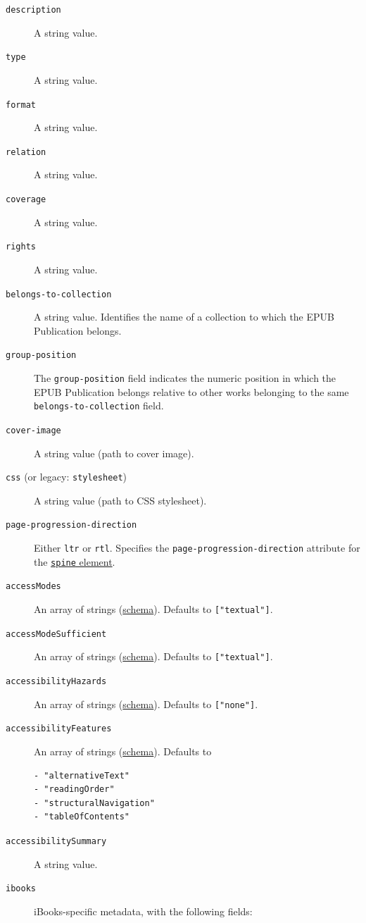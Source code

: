 \documentclass[
]{article}
\begin{document}
\begin{description}
\item[\texttt{description}]
A string value.
\item[\texttt{type}]
A string value.
\item[\texttt{format}]
A string value.
\item[\texttt{relation}]
A string value.
\item[\texttt{coverage}]
A string value.
\item[\texttt{rights}]
A string value.
\item[\texttt{belongs-to-collection}]
A string value. Identifies the name of a collection to which the EPUB
Publication belongs.
\item[\texttt{group-position}]
The \texttt{group-position} field indicates the numeric position in
which the EPUB Publication belongs relative to other works belonging to
the same \texttt{belongs-to-collection} field.
\item[\texttt{cover-image}]
A string value (path to cover image).
\item[\texttt{css} (or legacy: \texttt{stylesheet})]
A string value (path to CSS stylesheet).
\item[\texttt{page-progression-direction}]
Either \texttt{ltr} or \texttt{rtl}. Specifies the
\texttt{page-progression-direction} attribute for the
\href{http://idpf.org/epub/301/spec/epub-publications.html\#sec-spine-elem}{\texttt{spine}
element}.
\item[\texttt{accessModes}]
An array of strings
(\href{https://kb.daisy.org/publishing/docs/metadata/schema.org/index.html}{schema}).
Defaults to \texttt{{[}"textual"{]}}.
\item[\texttt{accessModeSufficient}]
An array of strings
(\href{https://kb.daisy.org/publishing/docs/metadata/schema.org/index.html}{schema}).
Defaults to \texttt{{[}"textual"{]}}.
\item[\texttt{accessibilityHazards}]
An array of strings
(\href{https://kb.daisy.org/publishing/docs/metadata/schema.org/index.html}{schema}).
Defaults to \texttt{{[}"none"{]}}.
\item[\texttt{accessibilityFeatures}]
An array of strings
(\href{https://kb.daisy.org/publishing/docs/metadata/schema.org/index.html}{schema}).
Defaults to

\begin{verbatim}
- "alternativeText"
- "readingOrder"
- "structuralNavigation"
- "tableOfContents"
\end{verbatim}
\item[\texttt{accessibilitySummary}]
A string value.
\item[\texttt{ibooks}]
iBooks-specific metadata, with the following fields:


\end{description}
\end{document}
